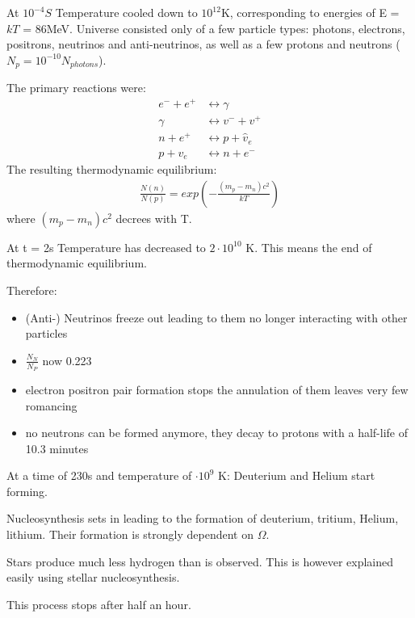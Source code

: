 \documentclass[11pt,a4paper]{article}
\begin{document}
At $10^{-4}S $ Temperature cooled down to $10^{12}$K, corresponding to energies of E = $kT$ = 86MeV.
Universe consisted only of a few particle types:
photons, electrons, positrons, neutrinos and anti-neutrinos, as well as a few protons and neutrons ($N_p = 10^{-10}N_{photons}$). 

The primary reactions were:
\begin{align*}
    e^- + e^+ &\leftrightarrow \gamma \\ 
    \gamma &\leftrightarrow v^- + v^+ \\ 
    n + e^+ &\leftrightarrow p + \hat v_e \\
    p + v_e &\leftrightarrow n + e^-
\end{align*}
The resulting thermodynamic equilibrium:
\begin{align*}
    \frac {N(n)}{N(p)} = exp (-\frac{(m_p - m_n)c^2}{kT}) 
\end{align*}
where $(m_p - m_n)c^2$ decrees with T.

At t = 2s Temperature has decreased to $2 \cdot 10^{10}$ K.
This means the end of thermodynamic equilibrium.

Therefore:
\begin{itemize}
    \item (Anti-) Neutrinos freeze out leading to them no longer interacting with other particles
    \item $\frac {N_N}{N_P}$ now 0.223
    \item electron positron pair formation stops the annulation of them leaves very few romancing
    \item no neutrons can be formed anymore, they decay to protons with a half-life of 10.3 minutes 
\end{itemize}
At a time of 230s and temperature of $\cdot 10^{9}$ K:
Deuterium and Helium start forming.

Nucleosynthesis sets in leading to the formation of deuterium, tritium, Helium, lithium.
Their formation is strongly dependent on $\Omega$. 

Stars produce much less hydrogen than is observed. 
This is however explained easily using stellar nucleosynthesis.

This process stops after half an hour.
\end{document}
